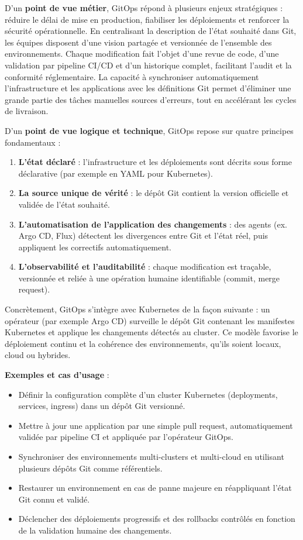 D’un \textbf{point de vue métier}, GitOps répond à plusieurs enjeux stratégiques : réduire le délai de mise en production, fiabiliser les déploiements et renforcer la sécurité opérationnelle. En centralisant la description de l’état souhaité dans Git, les équipes disposent d’une vision partagée et versionnée de l’ensemble des environnements. Chaque modification fait l’objet d’une revue de code, d’une validation par pipeline CI/CD et d’un historique complet, facilitant l’audit et la conformité réglementaire. La capacité à synchroniser automatiquement l’infrastructure et les applications avec les définitions Git permet d’éliminer une grande partie des tâches manuelles sources d’erreurs, tout en accélérant les cycles de livraison.

D’un \textbf{point de vue logique et technique}, GitOps repose sur quatre principes fondamentaux :
\begin{enumerate}
	\item \textbf{L’état déclaré} : l’infrastructure et les déploiements sont décrits sous forme déclarative (par exemple en YAML pour Kubernetes).
	\item \textbf{La source unique de vérité} : le dépôt Git contient la version officielle et validée de l’état souhaité.
	\item \textbf{L’automatisation de l’application des changements} : des agents (ex. Argo CD, Flux) détectent les divergences entre Git et l’état réel, puis appliquent les correctifs automatiquement.
	\item \textbf{L’observabilité et l’auditabilité} : chaque modification est traçable, versionnée et reliée à une opération humaine identifiable (commit, merge request).
\end{enumerate}

Concrètement, GitOps s’intègre avec Kubernetes de la façon suivante : un opérateur (par exemple Argo CD) surveille le dépôt Git contenant les manifestes Kubernetes et applique les changements détectés au cluster. Ce modèle favorise le déploiement continu et la cohérence des environnements, qu’ils soient locaux, cloud ou hybrides.

\textbf{Exemples et cas d’usage} :
\begin{itemize}
	\item Définir la configuration complète d’un cluster Kubernetes (deployments, services, ingress) dans un dépôt Git versionné.
	\item Mettre à jour une application par une simple pull request, automatiquement validée par pipeline CI et appliquée par l’opérateur GitOps.
	\item Synchroniser des environnements multi-clusters et multi-cloud en utilisant plusieurs dépôts Git comme référentiels.
	\item Restaurer un environnement en cas de panne majeure en réappliquant l’état Git connu et validé.
	\item Déclencher des déploiements progressifs et des rollbacks contrôlés en fonction de la validation humaine des changements.
\end{itemize}

